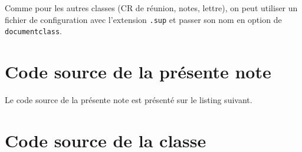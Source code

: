 \documentclass[french]{supaero-note-cf}
\begin{document}
Comme pour les autres classes (CR de réunion, notes, lettre), on
peut utiliser un fichier de configuration avec l'extension
\texttt{.sup} et passer son nom en option de \texttt{documentclass}.

\section{Code source de la présente note}
\label{sec:code-source}

Le code source de la présente note est présenté sur le listing
suivant.



\section{Code source de la classe}
\label{sec:code-source-supaero-note(cf)}


\end{document}
